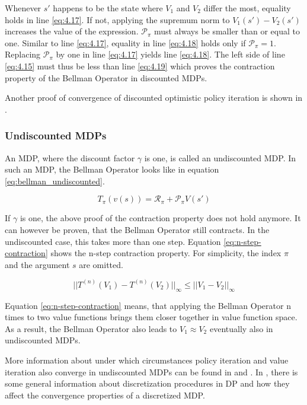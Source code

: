 Whenever $s'$ happens to be the state where $V_1$ and $V_2$ differ the most, equality holds in line \ref{eq:4.17}. If not, applying the supremum norm to $V_1(s')-V_2(s')$ increases the value of the expression. $\mathcal{P}_\pi$ must always be smaller than or equal to one. Similar to line \ref{eq:4.17}, equality in line \ref{eq:4.18} holds only if $\mathcal{P}_\pi=1$. Replacing $\mathcal{P}_\pi$ by one in line \ref{eq:4.17} yields line \ref{eq:4.18}. The left side of line \ref{eq:4.15} must thus be less than line \ref{eq:4.19} which proves the contraction property of the Bellman Operator in discounted MDPs.

Another proof of convergence of discounted optimistic policy iteration is shown in \cite{Tsitsiklis2003}.

\subsubsection*{Undiscounted MDPs}

An MDP, where the discount factor $\gamma$ is one, is called an undiscounted MDP. In such an MDP, the Bellman Operator looks like in equation \ref{eq:bellman_undiscounted}.

\begin{equation}
T_\pi(v(s))=\mathcal{R}_\pi + \mathcal{P}_\pi V(s')
\label{eq:bellman_undiscounted}
\end{equation}

If $\gamma$ is one, the above proof of the contraction property does not hold anymore. It can however be proven, that the Bellman Operator still contracts. In the undiscounted case, this takes more than one step. Equation \ref{eq:n-step-contraction} shows the n-step contraction property. For simplicity, the index $\pi$ and the argument $s$ are omitted.

\begin{equation}
||T^{(n)}(V_1)-T^{(n)}(V_2)||_\infty \leq ||V_1-V_2||_\infty
\label{eq:n-step-contraction}
\end{equation}

Equation \ref{eq:n-step-contraction} means, that applying the Bellman Operator n times to two value functions brings them closer together in value function space. As a result, the Bellman Operator also leads to $V_1 \approx V_2$ eventually also in undiscounted MDPs.

More information about under which circumstances policy iteration and value iteration also converge in undiscounted MDPs can be found in \cite{Hordijk_PI_conv_1987} and \cite{cavazos1998}. In \cite{ConvDiscDP}, there is some general information about discretization procedures in DP and how they affect the convergence properties of a discretized MDP.

